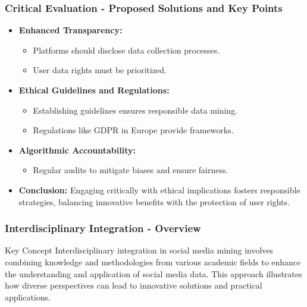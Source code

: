 \documentclass{beamer}
\begin{document}
\begin{frame}[fragile]
    \frametitle{Critical Evaluation - Proposed Solutions and Key Points}
    \begin{itemize}
        \item \textbf{Enhanced Transparency:} 
            \begin{itemize}
                \item Platforms should disclose data collection processes.
                \item User data rights must be prioritized.
            \end{itemize}
        
        \item \textbf{Ethical Guidelines and Regulations:}
            \begin{itemize}
                \item Establishing guidelines ensures responsible data mining.
                \item Regulations like GDPR in Europe provide frameworks.
            \end{itemize}
        
        \item \textbf{Algorithmic Accountability:}
            \begin{itemize}
                \item Regular audits to mitigate biases and ensure fairness.
            \end{itemize}
        
        \item \textbf{Conclusion:} Engaging critically with ethical implications fosters responsible strategies, balancing innovative benefits with the protection of user rights.
    \end{itemize}
\end{frame}

\begin{frame}[fragile]
    \frametitle{Interdisciplinary Integration - Overview}
    \begin{block}{Key Concept}
        Interdisciplinary integration in social media mining involves combining knowledge and methodologies from various academic fields to enhance the understanding and application of social media data. This approach illustrates how diverse perspectives can lead to innovative solutions and practical applications.
    \end{block}
\end{frame}
\end{document}
